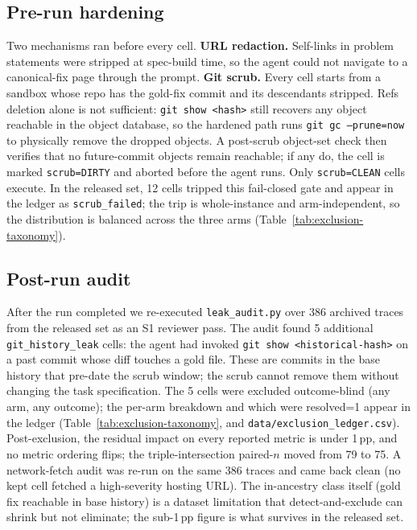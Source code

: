 \subsection{Pre-run hardening}
\label{sec:integrity-hardening}

Two mechanisms ran before every cell. \textbf{URL redaction.} Self-links in problem
statements were stripped at spec-build time, so the agent could not navigate to a
canonical-fix page through the prompt. \textbf{Git scrub.} Every cell starts from a
sandbox whose repo has the gold-fix commit and its descendants stripped. Refs deletion
alone is not sufficient: \texttt{git show <hash>} still recovers any object reachable in
the object database, so the hardened path runs \texttt{git gc --prune=now} to physically
remove the dropped objects. A post-scrub object-set check then verifies that no
future-commit objects remain reachable; if any do, the cell is marked
\texttt{scrub=DIRTY} and aborted before the agent runs. Only \texttt{scrub=CLEAN} cells
execute. In the released set, 12 cells tripped this fail-closed gate and appear in the
ledger as \texttt{scrub\_failed}; the trip is whole-instance and arm-independent, so the
distribution is balanced across the three arms (Table~\ref{tab:exclusion-taxonomy}).

\subsection{Post-run audit}
\label{sec:integrity-audit}

After the run completed we re-executed \texttt{leak\_audit.py} over 386 archived
traces from the released set as an S1 reviewer pass. The audit found 5 additional
\texttt{git\_history\_leak} cells: the agent had invoked \texttt{git show <historical-hash>}
on a past commit whose diff touches a gold file. These are commits in the base history
that pre-date the scrub window; the scrub cannot remove them without changing the task
specification. The 5 cells were excluded outcome-blind (any arm, any outcome); the
per-arm breakdown and which were resolved=1 appear in the ledger
(Table~\ref{tab:exclusion-taxonomy}, and \texttt{data/exclusion\_ledger.csv}). Post-exclusion,
the residual impact on every reported metric is under 1\,pp, and no metric ordering flips;
the triple-intersection paired-$n$ moved from 79 to 75. A network-fetch audit was re-run on
the same 386 traces and came back clean (no kept cell fetched a high-severity hosting URL).
The in-ancestry class itself (gold fix reachable in base history) is a dataset limitation
that detect-and-exclude can shrink but not eliminate; the sub-1\,pp figure is what survives
in the released set.

